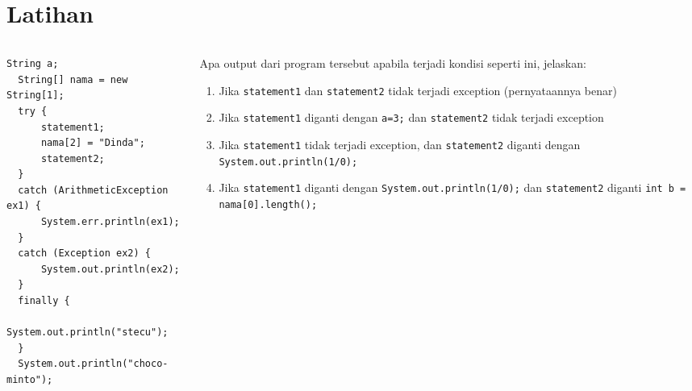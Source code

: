 \documentclass{../praktikum-ppt}
\begin{document}
    \section{Latihan}
    \begin{frame}[fragile]
      \begin{columns}
        \begin{column}{0.45\textwidth}
          \begin{lstlisting}[numberstyle=\scriptsize\ttfamily\color{lightgray},basicstyle=\scriptsize\ttfamily]
  String a;
  String[] nama = new String[1];
  try {
      statement1;
      nama[2] = "Dinda";
      statement2;
  }
  catch (ArithmeticException ex1) {
      System.err.println(ex1);
  }
  catch (Exception ex2) {
      System.out.println(ex2);
  }
  finally {
      System.out.println("stecu");
  }
  System.out.println("choco-minto");
            \end{lstlisting}
        \end{column}
        \begin{column}{0.5\textwidth}
        \begin{latihan}
          Apa output dari program tersebut apabila terjadi kondisi seperti ini, jelaskan:
        
        \begin{enumerate}
            \item Jika \texttt{statement1} dan \texttt{statement2} tidak terjadi exception (pernyataannya benar)
            \item Jika \texttt{statement1} diganti dengan \texttt{a=3;} dan \texttt{statement2} tidak terjadi exception
            \item Jika \texttt{statement1} tidak terjadi exception, dan \texttt{statement2} diganti dengan \texttt{System.out.println(1/0);}
            \item Jika \texttt{statement1} diganti dengan \texttt{System.out.println(1/0);} dan \texttt{statement2} diganti \texttt{int b = nama[0].length();}
        \end{enumerate}
          \end{latihan}
        \end{column}
      \end{columns}

    \end{frame}
    
\end{document}
